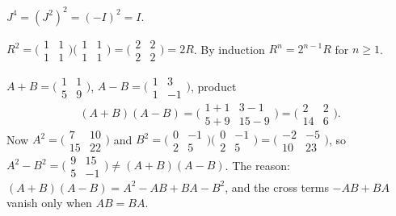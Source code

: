 \begin{solutions}
    \item $J^{4} = (J^{2})^{2} = (-I)^{2} = I$.

    \item $R^{2} = \bigl(\begin{smallmatrix} 1 & 1 \\ 1 & 1 \end{smallmatrix}\bigr)\bigl(\begin{smallmatrix} 1 & 1 \\ 1 & 1 \end{smallmatrix}\bigr) = \bigl(\begin{smallmatrix} 2 & 2 \\ 2 & 2 \end{smallmatrix}\bigr) = 2 R$. By induction $R^{n} = 2^{n - 1} R$ for $n \ge 1$.

    \item $A + B = \bigl(\begin{smallmatrix} 1 & 1 \\ 5 & 9 \end{smallmatrix}\bigr)$, $A - B = \bigl(\begin{smallmatrix} 1 & 3 \\ 1 & -1 \end{smallmatrix}\bigr)$, product
    \[
    (A + B)(A - B) = \bigl(\begin{smallmatrix} 1 + 1 & 3 - 1 \\ 5 + 9 & 15 - 9 \end{smallmatrix}\bigr) = \bigl(\begin{smallmatrix} 2 & 2 \\ 14 & 6 \end{smallmatrix}\bigr).
    \]
    Now $A^{2} = \bigl(\begin{smallmatrix} 7 & 10 \\ 15 & 22 \end{smallmatrix}\bigr)$ and $B^{2} = \bigl(\begin{smallmatrix} 0 & -1 \\ 2 & 5 \end{smallmatrix}\bigr)\bigl(\begin{smallmatrix} 0 & -1 \\ 2 & 5 \end{smallmatrix}\bigr) = \bigl(\begin{smallmatrix} -2 & -5 \\ 10 & 23 \end{smallmatrix}\bigr)$, so $A^{2} - B^{2} = \bigl(\begin{smallmatrix} 9 & 15 \\ 5 & -1 \end{smallmatrix}\bigr) \neq (A+B)(A-B)$. The reason: $(A+B)(A-B) = A^{2} - A B + B A - B^{2}$, and the cross terms $-A B + B A$ vanish only when $A B = B A$.


\end{solutions}
